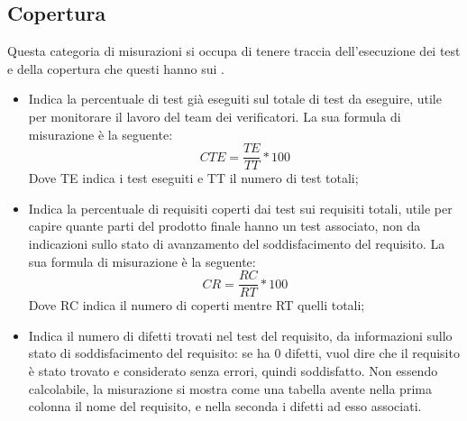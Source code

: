 \documentclass[PianoDiProgetto.tex]{subfiles}
\begin{document}
\subsection{Copertura}
Questa categoria di misurazioni si occupa di tenere traccia dell'esecuzione dei test e della copertura che questi hanno sui .
\begin{itemize}
	\item {} Indica la percentuale di test già eseguiti sul totale di test da eseguire, utile per monitorare il lavoro del team dei verificatori. La sua formula di misurazione è la seguente:
	\[CTE=\dfrac{TE}{TT}*100\]
	Dove TE indica i test eseguiti e TT il numero di test totali;
	\item {} Indica la percentuale di requisiti coperti dai test sui requisiti totali, utile per capire quante parti del prodotto finale hanno un test associato, non da indicazioni sullo stato di avanzamento del soddisfacimento del requisito. La sua formula di misurazione è la seguente:
	\[CR=\dfrac{RC}{RT}*100\]
	Dove RC indica il numero di  coperti mentre RT quelli totali;
	\item {} Indica il numero di difetti trovati nel test del requisito, da informazioni sullo stato di soddisfacimento del requisito: se ha 0 difetti, vuol dire che il requisito è stato trovato e considerato senza errori, quindi soddisfatto.
	Non essendo calcolabile, la misurazione si mostra come una tabella avente nella prima colonna il nome del requisito, e nella seconda i difetti ad esso associati.
\end{itemize}
\begin{comment}
\subsection{Efficacia dei cambiamenti}
\begin{itemize}
	\item \textlink{MTSH005TAB}{MTSH005}{\textbf{MTSH005 Tasso di iniezione dei difetti:}} Indica il tasso di errori attribuibili all'introduzione di una modifica, la conoscenza di questo numero aiuta a stimare il tempo medio per la scoperta e correzione di errori introdotti dalle modifiche, aiutando la stima dei costi per l'introduzione di nuove funzionalità
	\[TID=\dfrac{NM}{NDM}\]
	Dove NM indica il numero di modifiche e NDM i difetti attribuibili ad esse.
\end{itemize}
\end{comment}
\end{document}
